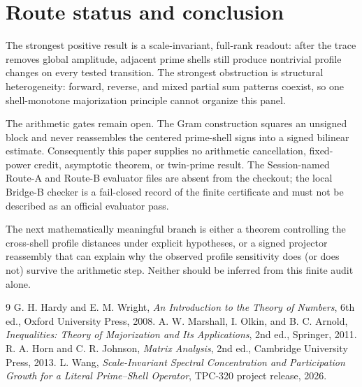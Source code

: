 \documentclass[10pt]{article}
\begin{document}
\section{Route status and conclusion}

The strongest positive result is a scale-invariant, full-rank readout: after
the trace removes global amplitude, adjacent prime shells still produce
nontrivial profile changes on every tested transition.  The strongest
obstruction is structural heterogeneity: forward, reverse, and mixed partial
sum patterns coexist, so one shell-monotone majorization principle cannot
organize this panel.

The arithmetic gates remain open.  The Gram construction squares an unsigned
block and never reassembles the centered prime-shell signs into a signed
bilinear estimate.  Consequently this paper supplies no arithmetic
cancellation, fixed-power credit, asymptotic theorem, or twin-prime result.
The Session-named Route-A and Route-B evaluator files are absent from the
checkout; the local Bridge-B checker is a fail-closed record of the finite
certificate and must not be described as an official evaluator pass.

The next mathematically meaningful branch is either a theorem controlling the
cross-shell profile distances under explicit hypotheses, or a signed
projector reassembly that can explain why the observed profile sensitivity
does (or does not) survive the arithmetic step.  Neither should be inferred
from this finite audit alone.

\begin{thebibliography}{9}
G. H. Hardy and E. M. Wright, \emph{An Introduction to the Theory of Numbers},
6th ed., Oxford University Press, 2008.
A. W. Marshall, I. Olkin, and B. C. Arnold, \emph{Inequalities: Theory of
Majorization and Its Applications}, 2nd ed., Springer, 2011.
R. A. Horn and C. R. Johnson, \emph{Matrix Analysis}, 2nd ed., Cambridge
University Press, 2013.
L. Wang, \emph{Scale-Invariant Spectral Concentration and Participation
Growth for a Literal Prime--Shell Operator}, TPC-320 project release, 2026.
\end{thebibliography}
\end{document}
